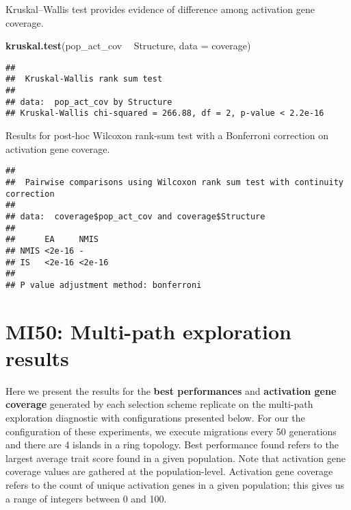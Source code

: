 \documentclass[]{book}
\newenvironment{Shaded}{\begin{snugshade}}{\end{snugshade}}
\newcommand{\DataTypeTok}[1]{\textcolor[rgb]{0.13,0.29,0.53}{#1}}
\newcommand{\KeywordTok}[1]{\textcolor[rgb]{0.13,0.29,0.53}{\textbf{#1}}}
\newcommand{\NormalTok}[1]{#1}
\newcommand{\OperatorTok}[1]{\textcolor[rgb]{0.81,0.36,0.00}{\textbf{#1}}}
\newcommand{\OtherTok}[1]{\textcolor[rgb]{0.56,0.35,0.01}{#1}}
\newcommand{\StringTok}[1]{\textcolor[rgb]{0.31,0.60,0.02}{#1}}
\begin{document}
Kruskal--Wallis test provides evidence of difference among activation gene coverage.

\begin{Shaded}
\begin{Highlighting}[]
\KeywordTok{kruskal.test}\NormalTok{(pop_act_cov }\OperatorTok{~}\StringTok{ }\NormalTok{Structure, }\DataTypeTok{data =}\NormalTok{ coverage)}
\end{Highlighting}
\end{Shaded}

\begin{verbatim}
## 
##  Kruskal-Wallis rank sum test
## 
## data:  pop_act_cov by Structure
## Kruskal-Wallis chi-squared = 266.88, df = 2, p-value < 2.2e-16
\end{verbatim}

Results for post-hoc Wilcoxon rank-sum test with a Bonferroni correction on activation gene coverage.

\begin{Shaded}
\end{Shaded}

\begin{verbatim}
## 
##  Pairwise comparisons using Wilcoxon rank sum test with continuity correction 
## 
## data:  coverage$pop_act_cov and coverage$Structure 
## 
##      EA     NMIS  
## NMIS <2e-16 -     
## IS   <2e-16 <2e-16
## 
## P value adjustment method: bonferroni
\end{verbatim}

\hypertarget{mi50-multi-path-exploration-results}{%
\chapter{MI50: Multi-path exploration results}\label{mi50-multi-path-exploration-results}}

Here we present the results for the \textbf{best performances} and \textbf{activation gene coverage} generated by each selection scheme replicate on the multi-path exploration diagnostic with configurations presented below.
For our the configuration of these experiments, we execute migrations every 50 generations and there are 4 islands in a ring topology.
Best performance found refers to the largest average trait score found in a given population.
Note that activation gene coverage values are gathered at the population-level.
Activation gene coverage refers to the count of unique activation genes in a given population; this gives us a range of integers between 0 and 100.
\end{document}
